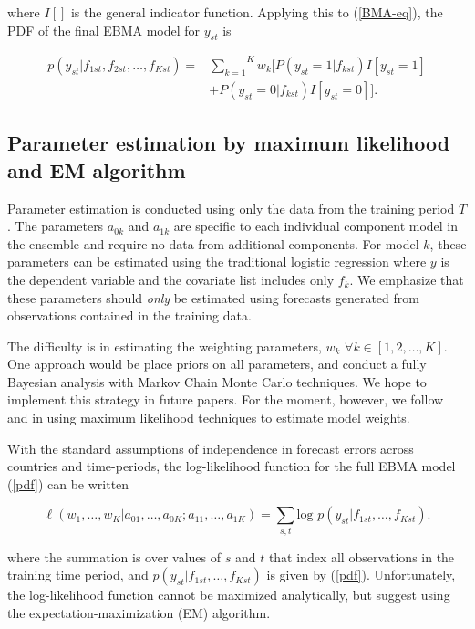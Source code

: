 \documentclass[pdftex,12pt,fullpage,oneside]{amsart}
\begin{document}
\noindent where $I[]$ is the general indicator function.  Applying
this to (\ref{BMA-eq}), the PDF of the final EBMA model for $y_{st}$
is

\begin{equation}
\label{pdf}
\begin{array}{rl}
p(y_{st}|f_{1st}, f_{2st}, \ldots, f_{Kst}) = &
\overset{K}{\underset{k=1}{\sum}} w_k [
P(y_{st}=1|f_{kst})I[y_{st}=1] \\
& + P(y_{st}=0|f_{kst})I[y_{st}=0]].\end{array}
\end{equation}

\subsection{Parameter estimation by maximum likelihood and EM
algorithm}

Parameter estimation is conducted using only the data from the
training period $T$.  The parameters $a_{0k}$ and $a_{1k}$ are
specific to each individual component model in the ensemble and
require no data from additional components. For model $k$, these
parameters can be estimated using the traditional logistic regression
where $y$ is the dependent variable and the covariate list includes
only $f_k$.  We emphasize that these parameters should
\textit{only} be estimated using forecasts generated from observations
contained in the training data.


The difficulty is in estimating the weighting parameters, $w_k$
$\forall k \in [1, 2, \dots, K]$. One approach would be place priors
on all parameters, and conduct a fully Bayesian analysis with Markov
Chain Monte Carlo techniques. We hope to implement this strategy in
future papers.  For the moment, however, we follow
\citet{Raftery:2005} and \citet{Sloughter:2007} in using
maximum likelihood techniques to estimate model weights.

With the standard assumptions of independence in forecast errors
across countries and time-periods, the log-likelihood function for the
full EBMA model (\ref{pdf}) can be written

\begin{equation}
  \ell (w_1, \ldots, w_K | a_{01},  \ldots, a_{0K}; a_{11},
  \ldots, a_{1K})= \underset{s,t}{\sum}\mbox{log }p(y_{st} |
  f_{1st}, \ldots, f_{Kst}).
\end{equation}

\noindent where the summation is over values of $s$ and $t$ that index
all observations in the training time period, and $p(y_{st}|f_{1st},
\ldots, f_{Kst}) $ is given by (\ref{pdf}).  Unfortunately, the
log-likelihood function cannot be maximized analytically, but
\citet{Sloughter:2007} suggest using the expectation-maximization (EM)
algorithm.
\end{document}
